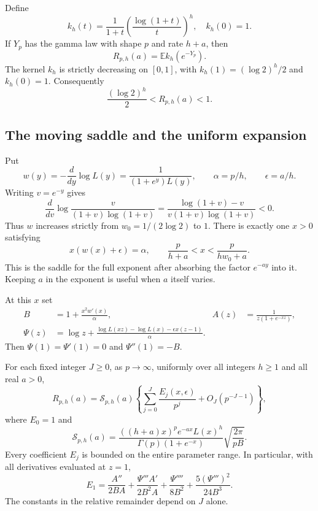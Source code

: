 Define
\[
 k_h(t)=\frac1{1+t}\left(\frac{\log(1+t)}t\right)^h,
 \quad k_h(0)=1.
\]
If $Y_p$ has the gamma law with shape $p$ and rate $h+a$, then
\begin{equation}\label{us:eq:gamma}
 R_{p,h}(a)=\mathbb E k_h(e^{-Y_p}).
\end{equation}
The kernel $k_h$ is strictly decreasing on $[0,1]$, with
$k_h(1)=(\log2)^h/2$ and $k_h(0)=1$. Consequently
\begin{equation}\label{us:eq:bounds}
 \frac{(\log2)^h}{2}<R_{p,h}(a)<1.
\end{equation}

\subsection{The moving saddle and the uniform expansion}

Put
\[
 w(y)=-\frac{d}{dy}\log L(y)
     =\frac1{(1+e^y)L(y)},\qquad
 \alpha=p/h,\qquad \epsilon=a/h.
\]
Writing $v=e^{-y}$ gives
\[
 \frac{d}{dv}\log\frac{v}{(1+v)\log(1+v)}
 =\frac{\log(1+v)-v}{v(1+v)\log(1+v)}<0.
\]
Thus $w$ increases strictly from $w_0=1/(2\log2)$ to $1$.
There is exactly one $x>0$ satisfying
\begin{equation}\label{us:eq:saddle}
 x(w(x)+\epsilon)=\alpha,
 \qquad
 \frac{p}{h+a}<x<\frac{p}{hw_0+a}.
\end{equation}
This is the saddle for the full exponent after absorbing the
factor $e^{-ay}$ into it. Keeping $a$ in the exponent is useful when
$a$ itself varies.

At this $x$ set
\begin{align}
 B&=1+\frac{x^2w'(x)}{\alpha},
 &A(z)&=\frac1{z(1+e^{-xz})},\label{us:eq:BA}\\
 \Psi(z)&=\log z+
  \frac{\log L(xz)-\log L(x)-\epsilon x(z-1)}\alpha.
 \label{us:eq:phase}
\end{align}
Then $\Psi(1)=\Psi'(1)=0$ and $\Psi''(1)=-B$.

\begin{theorem}
\label{us:thm:uniform}
For each fixed integer $J\ge0$, as $p\to\infty$, uniformly over
all integers $h\ge1$ and all real $a>0$,
\begin{equation}\label{us:eq:uniform}
 R_{p,h}(a)=\mathcal S_{p,h}(a)
 \left\{\sum_{j=0}^J\frac{E_j(x,\epsilon)}{p^j}
       +O_J(p^{-J-1})\right\},
\end{equation}
where $E_0=1$ and
\begin{equation}\label{us:eq:prefactor}
 \mathcal S_{p,h}(a)=
 \frac{((h+a)x)^p e^{-ax}L(x)^h}
      {\Gamma(p)(1+e^{-x})}
 \sqrt{\frac{2\pi}{pB}}.
\end{equation}
Every coefficient $E_j$ is bounded on the entire parameter range.
In particular, with all derivatives evaluated at $z=1$,
\begin{equation}\label{us:eq:E1}
 E_1=\frac{A''}{2BA}
      +\frac{\Psi'''A'}{2B^2A}
      +\frac{\Psi''''}{8B^2}
      +\frac{5(\Psi''')^2}{24B^3}.
\end{equation}
The constants in the relative remainder depend on $J$ alone.
\end{theorem}

